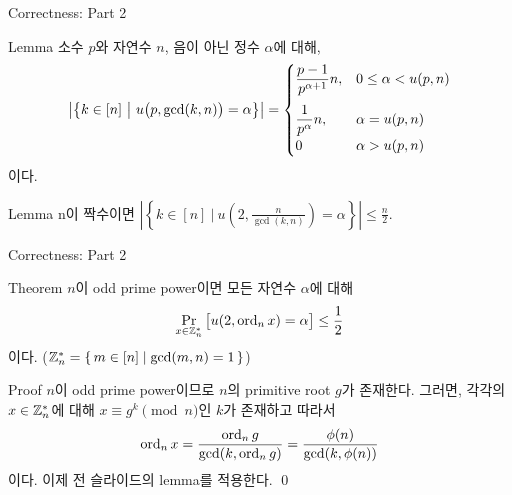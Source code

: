 \documentclass[../240513_msquare_shor.tex]{subfiles}
\begin{document}
\begin{frame}{Correctness: Part 2}
    \begin{block}{Lemma}
        소수 \(p\)와 자연수 \(n\), 음이 아닌 정수 \(\alpha\)에 대해,
        \[ \left| \left\{ k \in [n] \:\big|\: u\big( p, \gcd(k, n) \big) = \alpha \right\} \right| = \begin{cases}
            \displaystyle \frac{p-1}{p^{\alpha+1}}n \vspace*{.7em}, & 0 \leq \alpha < u(p, n) \\
            \displaystyle \frac{1}{p^\alpha}n, & \alpha = u(p, n) \\
            0 & \alpha > u(p, n)
        \end{cases} \]
        이다.
    \end{block}
    \pause
    \begin{block}{Lemma}
        n이 짝수이면
        $\displaystyle \left| \left\{ k \in [n] \:\bigg|\: u\left( 2, \frac{n}{\gcd(k, n)} \right) = \alpha \right\} \right| \leq \frac{n}{2}$.
    \end{block}
\end{frame}

\begin{frame}{Correctness: Part 2}
    \begin{block}{Theorem}
        \(n\)이 odd prime power이면 모든 자연수 \(\alpha\)에 대해
        \[
            \Pr_{x \in \mathbb{Z}_n^\ast} \big[ u(2, \operatorname{ord}_n x) = \alpha \big] \le \frac{1}{2}
        \]
        이다. (\(\mathbb{Z}_n^\ast = \{\,m \in [n] \mid \gcd(m,n)=1\,\}\))
    \end{block}
    \pause
    \begin{exampleblock}{Proof}
        \(n\)이 odd prime power이므로 \(n\)의
        primitive root \(g\)가 존재한다.
        그러면, 각각의 \(x \in \mathbb{Z}_n^\ast\)에 대해 \(x \equiv g^k \pmod{n}\)인
        \(k\)가 존재하고 따라서
        \[
            \operatorname{ord}_n x = \frac{\operatorname{ord}_n g}{\gcd(k, \operatorname{ord}_n g)} = \frac{\phi(n)}{\gcd(k, \phi(n))}
        \]
        이다. 이제 전 슬라이드의 lemma를 적용한다. \qed
    \end{exampleblock}
\end{frame}
\end{document}
